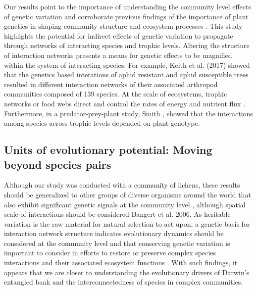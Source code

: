 \documentclass[9pt,twocolumn,twoside,lineno]{pnas-new}
\begin{document}
Our results point to the importance of understanding the community
level effects of genetic variation and corroborate previous findings
of the importance of plant genetics in shaping community structure and
ecosystem processes \cite{Whitham2006a}.  This study highlights the
potential for indirect effects of genetic variation to propagate
through networks of interacting species and trophic levels. Altering
the structure of interaction networks presents a means for genetic
effects to be magnified within the system of interacting species. For
example, Keith et al. (2017) showed that the genetics based
interations of aphid resistant and aphid susceptible trees resulted in
different interaction networks of their associated arthropod
communities composed of 139 species. At the scale of ecosystems,
trophic networks or food webs direct and control the rates of energy
and nutrient flux \cite{Borgatti2006}. Furthermore, in a
predator-prey-plant study, Smith \cite{Smith2011}, showed that the
interactions among species across trophic levels depended on plant
genotype.

\subsection{Units of evolutionary potential: Moving beyond species pairs}


Although our study was conducted with a community of lichens, these
results should be generalized to other groups of diverse organisms
around the world that also exhibit significant genetic signals at the
community level \cite{Rowntree2011, Whitham2012}, although spatial
scale of interactions should be considered \cite{Zook2010} Bangert et
al. 2006. As heritable variation is the raw material for natural
selection to act upon, a genetic basis for interaction network
structure indicates evolutionary dynamics should be considered at the
community level and that conserving genetic variation is important to
consider in efforts to restore or preserve complex species
interactions and their associated ecosystem functions
\cite{Evans2013}.  With such findings, it appears that we are closer
to understanding the evolutionary drivers of Darwin's entangled bank
and the interconnectedness of species in complex communities.



\showacknow{} %


\end{document}
